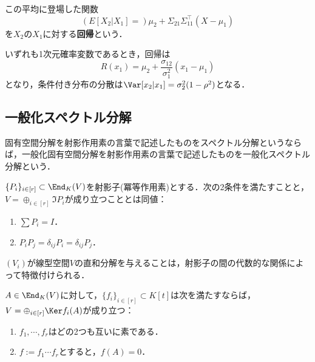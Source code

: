 \documentclass[uplatex, dvipdfmx]{jsreport}
\begin{document}
\begin{definition}[regression]
    この平均に登場した関数
    \[(E[X_2|X_1]=)\mu_2+\Sigma_{21}\Sigma_{11}^\top(X-\mu_1)\]
    を$X_2$の$X_1$に対する\textbf{回帰}という．
\end{definition}
\begin{example}
    いずれも1次元確率変数であるとき，回帰は
    \[R(x_1)=\mu_2+\frac{\sigma_{12}}{\sigma_1^2}(x_1-\mu_1)\]
    となり，条件付き分布の分散は$\Var[x_2|x_1]=\sigma_2^2(1-\rho^2)$となる．
\end{example}

\subsection{一般化スペクトル分解}

\begin{tcolorbox}[colframe=ForestGreen, colback=ForestGreen!10!white,breakable,colbacktitle=ForestGreen!40!white,coltitle=black,fonttitle=\bfseries\sffamily,
title=]
    固有空間分解を射影作用素の言葉で記述したものをスペクトル分解というならば，一般化固有空間分解を射影作用素の言葉で記述したものを一般化スペクトル分解という．
\end{tcolorbox}

\begin{proposition}[空間の直和分解の射影子による特徴付け]
    $\{P_i\}_{i\in[r]}\subset\End_K(V)$を射影子(冪等作用素)とする．次の2条件を満たすことと，$V=\oplus_{i\in[r]}\Im P_i$が成り立つこととは同値：
    \begin{enumerate}
        \item $\sum P_i=I$．
        \item $P_iP_j=\delta_{ij}P_i=\delta_{ij}P_j$．
    \end{enumerate}
\end{proposition}
\begin{remarks}
    $(V_i)$が線型空間$V$の直和分解を与えることは，射影子の間の代数的な関係によって特徴付けられる．
\end{remarks}

\begin{theorem}
    $A\in\End_K(V)$に対して，$\{f_i\}_{i\in[r]}\subset K[t]$は次を満たすならば，$V=\oplus_{i\in[r]}\Ker f_i(A)$が成り立つ：
    \begin{enumerate}
        \item $f_1,\cdots,f_r$はどの2つも互いに素である．
        \item $f:=f_1\cdots f_r$とすると，$f(A)=0$．
    \end{enumerate}
\end{theorem}
\end{document}
